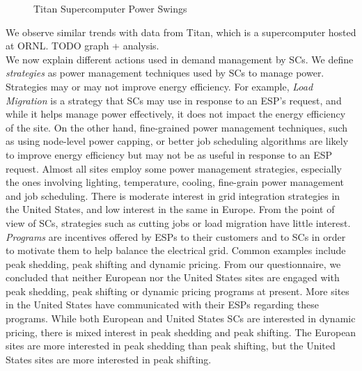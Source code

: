 \begin{figure}
\begin{center}
\caption{Titan Supercomputer Power Swings}
\label{fig:titan}
\end{center}
\end{figure}
We observe similar trends with data from Titan, which is a supercomputer hosted at ORNL. TODO graph + analysis. \\


We now explain different actions used in demand management by SCs. We define \emph{strategies} as power management techniques used by SCs to manage power. Strategies may or may not improve energy efficiency. For example, \emph{Load Migration} is a strategy that SCs may use in response to an ESP's request, and while it helps manage power effectively, it does not impact the energy efficiency of the site. On the other hand, fine-grained power management techniques, such as using node-level power capping, or better job scheduling algorithms are likely to improve energy efficiency but may not be as useful in response to an ESP request. Almost all sites employ some power management strategies, especially the ones involving lighting, temperature, cooling, fine-grain power management and job scheduling. There is moderate interest in grid integration strategies in the United States, and low interest in the same in Europe. From the point of view of SCs, strategies such as cutting jobs or load migration have little interest. \\

\emph{Programs} are incentives offered by ESPs to their customers and to SCs in order to motivate them to help balance the electrical grid. Common examples include peak shedding, peak shifting and dynamic pricing. From our questionnaire, we concluded that neither European nor the United States sites are engaged with peak shedding, peak shifting or dynamic pricing programs at present. More sites in the United States have communicated with their ESPs regarding these programs. While both European and United States SCs are interested in dynamic pricing, there is mixed interest in peak shedding and peak shifting. The European sites are more interested in peak shedding than peak shifting, but the United States sites are more interested in peak shifting. \\

